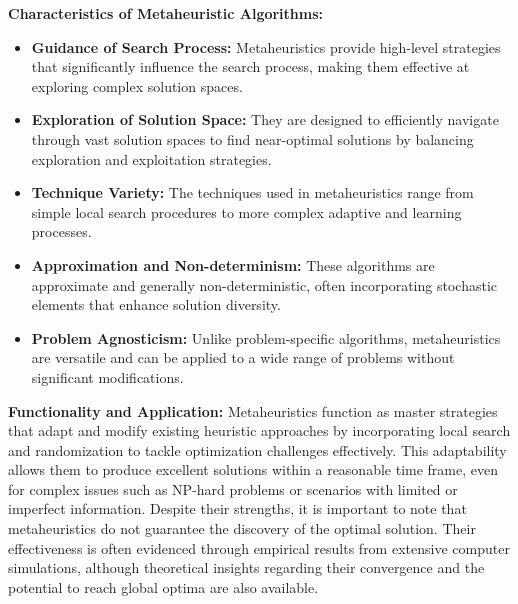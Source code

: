 \documentclass{article}
\begin{document}
    \textbf{Characteristics of Metaheuristic Algorithms:}
    \begin{itemize}
        \item \textbf{Guidance of Search Process:} Metaheuristics provide high-level strategies that significantly influence the search process, making them effective at exploring complex solution spaces.
        \item \textbf{Exploration of Solution Space:} They are designed to efficiently navigate through vast solution spaces to find near-optimal solutions by balancing exploration and exploitation strategies.
        \item \textbf{Technique Variety:} The techniques used in metaheuristics range from simple local search procedures to more complex adaptive and learning processes.
        \item \textbf{Approximation and Non-determinism:} These algorithms are approximate and generally non-deterministic, often incorporating stochastic elements that enhance solution diversity.
        \item \textbf{Problem Agnosticism:} Unlike problem-specific algorithms, metaheuristics are versatile and can be applied to a wide range of problems without significant modifications.
    \end{itemize} \cite{kaveh2021}

    \textbf{Functionality and Application:}
    Metaheuristics function as master strategies that adapt and modify existing heuristic approaches by incorporating local search and randomization to tackle optimization challenges effectively.
    This adaptability allows them to produce excellent solutions within a reasonable time frame, even for complex issues such as NP-hard problems or scenarios with limited or imperfect information.
    Despite their strengths, it is important to note that metaheuristics do not guarantee the discovery of the optimal solution.
    Their effectiveness is often evidenced through empirical results from extensive computer simulations, although theoretical insights regarding their convergence and the potential to reach global optima are also available. \cite{kaveh2021}
\end{document}
